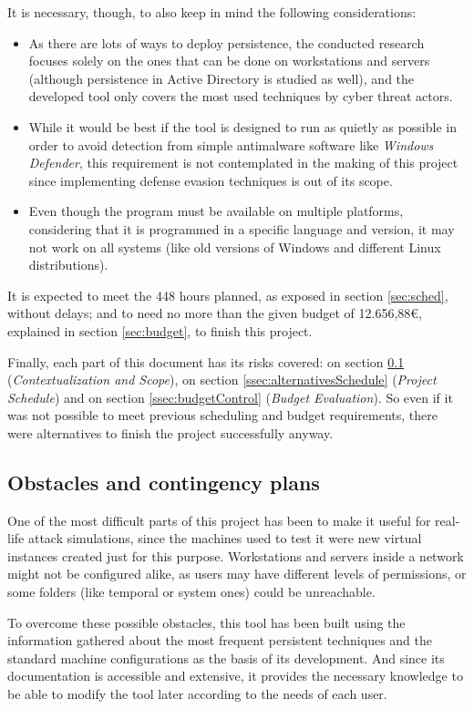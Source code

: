 It is necessary, though, to also keep in mind the following considerations:
\begin{itemize}
\item As there are lots of ways to deploy persistence, the conducted research focuses solely on the ones that can be done on workstations and servers (although persistence in Active Directory is studied as well), and the developed tool only covers the most used techniques by cyber threat actors.
\item While it would be best if the tool is designed to run as quietly as possible in order to avoid detection from simple antimalware software like \textit{Windows Defender}, this requirement is not contemplated in the making of this project since implementing defense evasion techniques is out of its scope.
\item Even though the program must be available on multiple platforms, considering that it is programmed in a specific language and version, it may not work on all systems (like old versions of Windows and different Linux distributions).
\end{itemize}

It is expected to meet the 448 hours planned, as exposed in section \ref{sec:sched}, without delays; and to need no more than the given budget of 12.656,88€, explained in section \ref{sec:budget}, to finish this project.

Finally, each part of this document has its risks covered: on section \ref{ssec:obstacles} (\textit{Contextualization and Scope}), on section \ref{ssec:alternativesSchedule} (\textit{Project Schedule}) and on section \ref{ssec:budgetControl} (\textit{Budget Evaluation}). So even if it was not possible to meet previous scheduling and budget requirements, there were alternatives to finish the project successfully anyway.


\subsection{Obstacles and contingency plans}
\label{ssec:obstacles}
One of the most difficult parts of this project has been to make it useful for real-life attack simulations, since the machines used to test it were new virtual instances created just for this purpose.
Workstations and servers inside a network might not be configured alike, as users may have different levels of permissions, or some folders (like temporal or system ones) could be unreachable.

To overcome these possible obstacles, this tool has been built using the information gathered about the most frequent persistent techniques and the standard machine configurations as the basis of its development. And since its documentation is accessible and extensive, it provides the necessary knowledge to be able to modify the tool later according to the needs of each user.